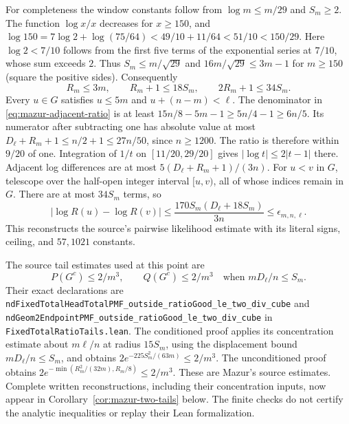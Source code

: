 \documentclass[11pt]{article}
\theoremstyle{remark}\newtheorem{remark}[proposition]{Remark}
\begin{document}
For completeness the window constants follow from
$\log m\le m/29$ and $S_m\ge2$. The function $\log x/x$ decreases
for $x\ge150$, and
$\log150=7\log2+\log(75/64)<49/10+11/64<51/10<150/29$.
Here $\log2<7/10$ follows from the first five terms of the exponential
series at $7/10$, whose sum exceeds $2$.
Thus $S_m\le m/\sqrt{29}$ and
$16m/\sqrt{29}\le3m-1$ for $m\ge150$ (square the positive sides).
Consequently
\[
 R_m\le3m,\qquad R_m+1\le18S_m,\qquad 2R_m+1\le34S_m.
\]
Every $u\in G$ satisfies $u\le5m$ and $u+(n-m)<\ell$.
The denominator in \eqref{eq:mazur-adjacent-ratio} is at least
$15n/8-5m-1\ge5n/4-1\ge6n/5$.
Its numerator after subtracting one has absolute value at most
$D_\ell+R_m+1\le n/2+1\le27n/50$, since $n\ge1200$.
The ratio is therefore within $9/20$ of one.
Integration of $1/t$ on $[11/20,29/20]$ gives
$|\log t|\le2|t-1|$ there. Adjacent log differences are at most
$5(D_\ell+R_m+1)/(3n)$.
For $u<v$ in $G$, telescope over the half-open integer interval
$[u,v)$, all of whose indices remain in $G$. There are at most $34S_m$
terms, so
\[
 |\log R(u)-\log R(v)|
 \le\frac{170S_m(D_\ell+18S_m)}{3n}
 \le\epsilon_{m,n,\ell}.
\]
This reconstructs the source's pairwise likelihood estimate with its
literal signs, ceiling, and $57,1021$ constants.

The source tail estimates used at this point are
\begin{equation}
 P(G^c)\le2/m^3,\qquad Q(G^c)\le2/m^3
 \quad\text{when }mD_\ell/n\le S_m.
 \label{eq:mazur-tail-input}
\end{equation}
Their exact declarations are
\texttt{ndFixedTotalHeadTotalPMF\_outside\_ratioGood\_le\_two\_div\_cube}
and \texttt{ndGeom2EndpointPMF\_outside\_ratioGood\_le\_two\_div\_cube}
in \texttt{FixedTotalRatioTails.lean}.
The conditioned proof applies its concentration estimate about $m\ell/n$
at radius $15S_m$, using the displacement bound $mD_\ell/n\le S_m$,
and obtains $2e^{-225S_m^2/(63m)}\le2/m^3$.
The unconditioned proof obtains
$2e^{-\min(R_m^2/(32m),R_m/8)}\le2/m^3$.
These are Mazur's source estimates. Complete written reconstructions,
including their concentration inputs, now appear in
Corollary~\ref{cor:mazur-two-tails} below. The finite checks do not
certify the analytic inequalities or replay their Lean formalization.
\end{document}
